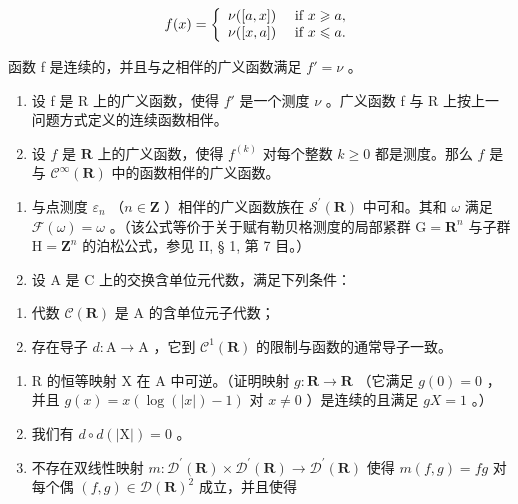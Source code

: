 \[
f (x) = \left\{ \begin{array}{l l} \nu ([ a, x ]) & \text { if } x \geqslant a, \\ \nu ([ x, a ]) & \text { if } x \leqslant a. \end{array} \right.
\]

函数 f 是连续的，并且与之相伴的广义函数满足 \(f' = \nu\) 。

\begin{enumerate}
\def\labelenumi{\alph{enumi})}
\setcounter{enumi}{1}
\item
  设 f 是 R 上的广义函数，使得 \(f'\) 是一个测度 \(\nu\) 。广义函数 f 与 R 上按上一问题方式定义的连续函数相伴。
\item
  设 \(f\) 是 \(\mathbf{R}\) 上的广义函数，使得 \(f^{(k)}\) 对每个整数 \(k \geqslant 0\) 都是测度。那么 \(f\) 是与 \(\mathcal{C}^{\infty}(\mathbf{R})\) 中的函数相伴的广义函数。
\end{enumerate}

\begin{enumerate}
\def\labelenumi{\arabic{enumi})}
\setcounter{enumi}{4}
\item
  与点测度 \(\varepsilon_{n}\) （\(n\in\mathbf{Z}\) ）相伴的广义函数族在 \(\mathcal{S}^{\prime}(\mathbf{R})\) 中可和。其和 \(\omega\) 满足 \(\mathcal{F}(\omega)=\omega\) 。（该公式等价于关于赋有勒贝格测度的局部紧群 \(\mathrm{G}=\mathbf{R}^{n}\) 与子群 \(\mathrm{H}=\mathbf{Z}^{n}\) 的泊松公式，参见 II, § 1, 第 7 目。）
\item
  设 A 是 C 上的交换含单位元代数，满足下列条件：
\end{enumerate}

\begin{enumerate}
\def\labelenumi{(\roman{enumi})}
\item
  代数 \(\mathcal{C}(\mathbf{R})\) 是 A 的含单位元子代数；
\item
  存在导子 \(d\colon\mathrm{A}\to\mathrm{A}\) ，它到 \(\mathcal{C}^{1}(\mathbf{R})\) 的限制与函数的通常导子一致。
\end{enumerate}

\begin{enumerate}
\def\labelenumi{\alph{enumi})}
\item
  R 的恒等映射 X 在 A 中可逆。（证明映射 \(g: \mathbf{R} \to \mathbf{R}\) （它满足 \(g(0) = 0\) ，并且 \(g(x) = x(\log(|x|) - 1)\) 对 \(x \neq 0\) ）是连续的且满足 \(gX = 1\) 。）
\item
  我们有 \(d \circ d(|\mathrm{X}|) = 0\) 。
\item
  不存在双线性映射 \(m\colon\mathcal{D}^{\prime}(\mathbf{R})\times\mathcal{D}^{\prime}(\mathbf{R})\to\mathcal{D}^{\prime}(\mathbf{R})\) 使得 \(m(f,g)=fg\) 对每个偶 \((f,g)\in\mathcal{D}(\mathbf{R})^{2}\) 成立，并且使得
\end{enumerate}

